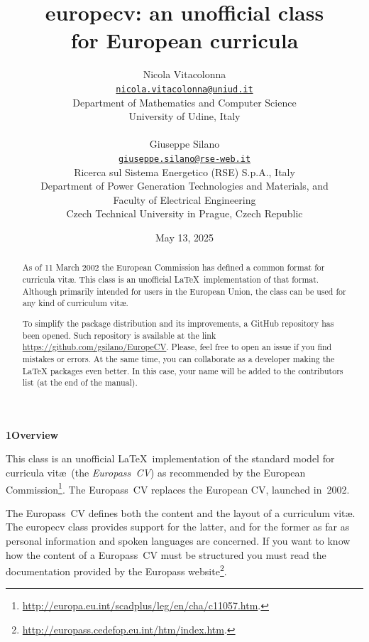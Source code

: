 \documentclass{europecv}
\title{\textsf{europecv}: an unofficial class\\
	for European curricula}
\author{Nicola Vitacolonna\\
	\href{mailto:nicola.vitacolonna@uniud.it}{\texttt{nicola.vitacolonna@uniud.it}}\\
	Department of Mathematics and Computer Science\\
	University of Udine, Italy\\
	\\
	Giuseppe Silano\\
	\href{mailto:giuseppe.silano@rse-web.it}{\texttt{giuseppe.silano@rse-web.it}}\\
    Ricerca sul Sistema Energetico (RSE) S.p.A., Italy\\ 
    Department of Power Generation Technologies and Materials, and\\
    Faculty of Electrical Engineering\\
    Czech Technical University in Prague, Czech Republic\\
}
\date{May 13, 2025}
\begin{document}

\maketitle

\pagestyle{plain}


\label{ABSTRACT}
\begin{abstract}

As of 11 March 2002 the European Commission has defined a common format for curricula vit\ae. This class is an unofficial \LaTeX\ implementation of that format. Although primarily intended for users in the European Union, the class can be used for any kind of curriculum vit\ae.

To simplify the package distribution and its improvements, a GitHub repository has been opened.
Such repository is available at the link \url{https://github.com/gsilano/EuropeCV}. Please, feel
free to open an issue if you find mistakes or errors. At the same time, you can collaborate as a
developer making the LaTeX packages even better. In this case, your name will be added to the
contributors list (at the end of the manual).

\end{abstract}



\label{Overview}
\vspace{0.25cm}
\textbf{\large{1\hspace{0.5cm}Overview}}
\vspace{0.25cm}

This class is an unofficial \LaTeX\ implementation of the standard model for curricula vit\ae\ (the
\emph{Europass~CV\/}) as recommended by the European
Commission\footnote{\url{http://europa.eu.int/scadplus/leg/en/cha/c11057.htm}.}. The Europass~CV
replaces the European CV, launched in~2002.

The Europass~CV defines both the content and the layout of a curriculum vit\ae. The
\textsf{europecv} class provides support for the latter, and for the former as far as personal
information and spoken languages are concerned. If you want to know how the content of a
Europass~CV must be structured you must read the documentation provided by the Europass
website\footnote{\url{http://europass.cedefop.eu.int/htm/index.htm}.}.
\end{document}

